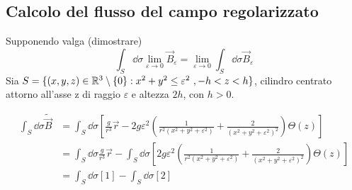 
\subsection{Calcolo del flusso del campo regolarizzato}
\label{sec:flusso_regolarizzato}
Supponendo valga (dimostrare)
$$
  \int_S \dd \sigma \lim_{\varepsilon \to 0} \vec B_\varepsilon = \lim_{\varepsilon \to 0} \int_S \dd \sigma \vec B_\varepsilon
$$
Sia $S = \{(x,y,z) \in \mathbb{R}^3 \setminus \{0\} : x^2 + y^2 \leq \varepsilon ^2\ ,-h<z<h\}$,
cilindro centrato attorno all'asse z di raggio $\varepsilon$ e altezza $2h$, con $h>0$.

\begin{equation*}
   \begin{split}
      \int_S \dd \sigma \tilde{\vec B}  &= \int_S \dd \sigma \left[\frac{g}{r^3}\vec r
         - 2g\varepsilon^2 \left( \frac{1}{r^2(x^2 + y^2 + \varepsilon^2)}
               + \frac{2}{(x^2 + y^2 + \varepsilon^2)^2}\right) \Theta(z)  \right] \\
         &= \int_S \dd \sigma \frac{g}{r^3}\vec r
            - \int_S \dd \sigma \left[ 2g\varepsilon^2 \left( \frac{1}{r^2(x^2 + y^2 + \varepsilon^2)}
                  + \frac{2}{(x^2 + y^2 + \varepsilon^2)^2}\right) \Theta(z) \right] \\
          &= \int_S \dd \sigma [1] - \int_S \dd \sigma [2]
   \end{split}
\end{equation*}

